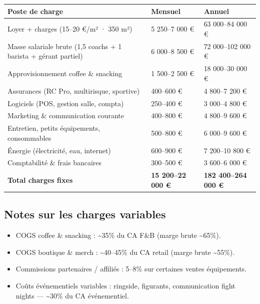 \documentclass[11pt, a4paper]{article}
\begin{document}
\begin{center}
\begin{tabular}{@{}p{6cm}p{3cm}p{3cm}@{}}
\toprule
\rowcolor{fc-ink}\color{white}\textbf{Poste de charge} & \color{white}\textbf{Mensuel} & \color{white}\textbf{Annuel} \\
\midrule
Loyer + charges (15–20 €/m² · 350 m²) & 5 250–7 000 € & 63 000–84 000 € \\
\rowcolor{fc-bg2} Masse salariale brute (1,5 coachs + 1 barista + gérant partiel) & 6 000–8 500 € & 72 000–102 000 € \\
Approvisionnement coffee \& snacking & 1 500–2 500 € & 18 000–30 000 € \\
\rowcolor{fc-bg2} Assurances (RC Pro, multirisque, sportive) & 400–600 € & 4 800–7 200 € \\
Logiciels (POS, gestion salle, compta) & 250–400 € & 3 000–4 800 € \\
\rowcolor{fc-bg2} Marketing \& communication courante & 400–800 € & 4 800–9 600 € \\
Entretien, petits équipements, consommables & 500–800 € & 6 000–9 600 € \\
\rowcolor{fc-bg2} Énergie (électricité, eau, internet) & 600–900 € & 7 200–10 800 € \\
Comptabilité \& frais bancaires & 300–500 € & 3 600–6 000 € \\
\midrule
\textbf{Total charges fixes} & \textbf{15 200–22 000 €} & \textbf{182 400–264 000 €} \\
\bottomrule
\end{tabular}
\end{center}

\subsection{Notes sur les charges variables}

\begin{itemize}
  \item COGS coffee \& snacking : \textasciitilde35\% du CA F\&B (marge brute \textasciitilde65\%).
  \item COGS boutique \& merch : \textasciitilde40–45\% du CA retail (marge brute \textasciitilde55\%).
  \item Commissions partenaires / affiliés : 5–8\% sur certaines ventes équipements.
  \item Coûts événementiels variables : ringside, figurants, communication fight nights — \textasciitilde30\% du CA événementiel.
\end{itemize}
\end{document}
